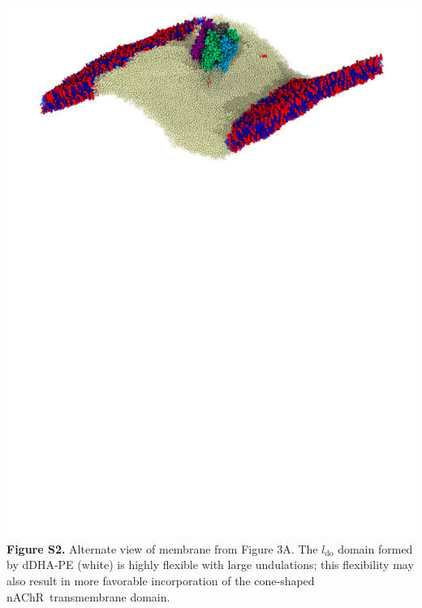 \documentclass[11pt]{report}
\newcommand{\ldo}{l_{\mathrm{do}}}
\newcommand{\nachr}{nAChR}
\begin{document}
\clearpage
		\includegraphics[width=1\linewidth]{Memb_Curve.pdf}
		{\bf Figure S2. }Alternate view of membrane from Figure 3A. The $\ldo$ domain formed by dDHA-PE (white) is highly flexible with large undulations; this flexibility may also result in more favorable incorporation of the cone-shaped \nachr~transmembrane domain. 
\end{document}
